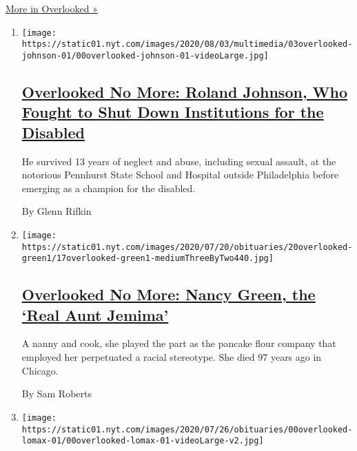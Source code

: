 \href{/spotlight/overlooked}{More in Overlooked »}

\begin{enumerate}
\def\labelenumi{\arabic{enumi}.}
\item
  \texttt{[image: https://static01.nyt.com/images/2020/08/03/multimedia/03overlooked-johnson-01/00overlooked-johnson-01-videoLarge.jpg]}

  \hypertarget{overlooked-no-more-roland-johnson-who-fought-to-shut-down-institutions-for-the-disabled}{%
  \subsection{\texorpdfstring{\href{/2020/07/31/obituaries/roland-johnson-overlooked.html}{Overlooked
  No More: Roland Johnson, Who Fought to Shut Down Institutions for the
  Disabled}}{Overlooked No More: Roland Johnson, Who Fought to Shut Down Institutions for the Disabled}}\label{overlooked-no-more-roland-johnson-who-fought-to-shut-down-institutions-for-the-disabled}}

  He survived 13 years of neglect and abuse, including sexual assault,
  at the notorious Pennhurst State School and Hospital outside
  Philadelphia before emerging as a champion for the disabled.

  By Glenn Rifkin
\item
  \texttt{[image: https://static01.nyt.com/images/2020/07/20/obituaries/20overlooked-green1/17overlooked-green1-mediumThreeByTwo440.jpg]}

  \hypertarget{overlooked-no-more-nancy-green-the-real-aunt-jemima}{%
  \subsection{\texorpdfstring{\href{/2020/07/17/obituaries/nancy-green-aunt-jemima-overlooked.html}{Overlooked
  No More: Nancy Green, the `Real Aunt
  Jemima'}}{Overlooked No More: Nancy Green, the `Real Aunt Jemima'}}\label{overlooked-no-more-nancy-green-the-real-aunt-jemima}}

  A nanny and cook, she played the part as the pancake flour company
  that employed her perpetuated a racial stereotype. She died 97 years
  ago in Chicago.

  By Sam Roberts
\item
  \texttt{[image: https://static01.nyt.com/images/2020/07/26/obituaries/00overlooked-lomax-01/00overlooked-lomax-01-videoLarge-v2.jpg]}

  \hypertarget{overlooked-no-more-brad-lomax-a-bridge-between-civil-rights-movements}{%
}
\end{enumerate}
